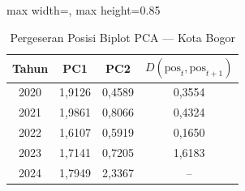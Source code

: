 \begin{table}[H]
\centering
\caption{Pergeseran Posisi Biplot PCA --- Kota Bogor} \label{tab:appjarak_pca_skor_kota_bogor}
\begin{adjustbox}{max width=\textwidth, max height=0.85\textheight}
\begin{tabular}{|c|c|c|c|}
\hline
\textbf{Tahun} & \textbf{PC1} & \textbf{PC2} & \textbf{$D(\text{pos}_t, \text{pos}_{t+1})$} \\
\hline
2020 & 1,9126 & 0,4589 & 0,3554 \\
2021 & 1,9861 & 0,8066 & 0,4324 \\
2022 & 1,6107 & 0,5919 & 0,1650 \\
2023 & 1,7141 & 0,7205 & 1,6183 \\
2024 & 1,7949 & 2,3367 & -- \\
\hline
\end{tabular}
\end{adjustbox}
\end{table}